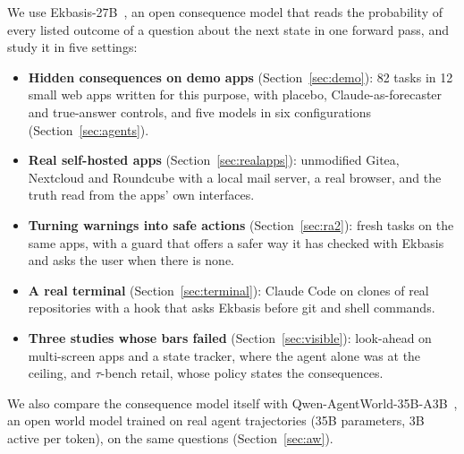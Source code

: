 \documentclass[11pt]{article}
\begin{document}
We use Ekbasis-27B~\cite{vicentino2026ekbasis}, an open consequence model that reads the probability of every listed
outcome of a question about the next state in one forward pass, and study it in five settings:
\begin{itemize}
  \item \textbf{Hidden consequences on demo apps} (Section~\ref{sec:demo}): 82 tasks in 12 small web apps written for
  this purpose, with placebo, Claude-as-forecaster and true-answer controls, and five models in six configurations
  (Section~\ref{sec:agents}).
  \item \textbf{Real self-hosted apps} (Section~\ref{sec:realapps}): unmodified Gitea, Nextcloud and Roundcube with a
  local mail server, a real browser, and the truth read from the apps' own interfaces.
  \item \textbf{Turning warnings into safe actions} (Section~\ref{sec:ra2}): fresh tasks on the same apps, with a guard
  that offers a safer way it has checked with Ekbasis and asks the user when there is none.
  \item \textbf{A real terminal} (Section~\ref{sec:terminal}): Claude Code on clones of real repositories with a hook
  that asks Ekbasis before git and shell commands.
  \item \textbf{Three studies whose bars failed} (Section~\ref{sec:visible}): look-ahead on multi-screen apps and a state
  tracker, where the agent alone was at the ceiling, and $\tau$-bench retail, whose policy states the consequences.
\end{itemize}
We also compare the consequence model itself with Qwen-AgentWorld-35B-A3B~\cite{zuo2026agentworld}, an open world model
trained on real agent trajectories (35B parameters, 3B active per token), on the same questions (Section~\ref{sec:aw}).
\end{document}
